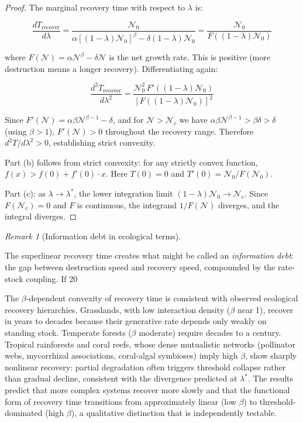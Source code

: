 \documentclass[11pt]{article}
\theoremstyle{plain}
\theoremstyle{definition}
\theoremstyle{remark}
\newtheorem{remark}{Remark}
\begin{document}
\begin{proof}
The marginal recovery time with respect to $\lambda$ is:

$$\frac{dT_{\text{recover}}}{d\lambda} = \frac{\mathcal{N}_0}{\alpha[(1-\lambda)\mathcal{N}_0]^\beta - \delta(1-\lambda)\mathcal{N}_0} = \frac{\mathcal{N}_0}{F((1-\lambda)\mathcal{N}_0)}$$

where $F(\mathcal{N}) = \alpha\mathcal{N}^\beta - \delta\mathcal{N}$ is the net growth rate. This is positive (more destruction means a longer recovery). Differentiating again:

$$\frac{d^2T_{\text{recover}}}{d\lambda^2} = \frac{\mathcal{N}_0^2 \, F'((1-\lambda)\mathcal{N}_0)}{[F((1-\lambda)\mathcal{N}_0)]^2}$$

Since $F'(\mathcal{N}) = \alpha\beta\mathcal{N}^{\beta-1} - \delta$, and for $\mathcal{N} > \mathcal{N}_c$ we have $\alpha\beta\mathcal{N}^{\beta-1} > \beta\delta > \delta$ (using $\beta > 1$), $F'(\mathcal{N}) > 0$ throughout the recovery range. Therefore $d^2T/d\lambda^2 > 0$, establishing strict convexity.

Part (b) follows from strict convexity: for any strictly convex function, $f(x) > f(0) + f'(0) \cdot x$. Here $T(0) = 0$ and $T'(0) = \mathcal{N}_0/F(\mathcal{N}_0)$.

Part (c): as $\lambda \to \lambda^*$, the lower integration limit $(1-\lambda)\mathcal{N}_0 \to \mathcal{N}_c$. Since $F(\mathcal{N}_c) = 0$ and $F$ is continuous, the integrand $1/F(\mathcal{N})$ diverges, and the integral diverges.
\end{proof}

\begin{remark}[Information debt in ecological terms]
\label{rem-information-debt}

The superlinear recovery time creates what might be called an \emph{information debt}: the gap between destruction speed and recovery speed, compounded by the rate-stock coupling. If 20%

The $\beta$-dependent convexity of recovery time is consistent with observed ecological recovery hierarchies. Grasslands, with low interaction density ($\beta$ near 1), recover in years to decades because their generative rate depends only weakly on standing stock. Temperate forests ($\beta$ moderate) require decades to a century. Tropical rainforests and coral reefs, whose dense mutualistic networks (pollinator webs, mycorrhizal associations, coral-algal symbioses) imply high $\beta$, show sharply nonlinear recovery: partial degradation often triggers threshold collapse rather than gradual decline, consistent with the divergence predicted at $\lambda^*$. The results predict that more complex systems recover more slowly and that the functional form of recovery time transitions from approximately linear (low $\beta$) to threshold-dominated (high $\beta$), a qualitative distinction that is independently testable.
\end{remark}
\end{document}
